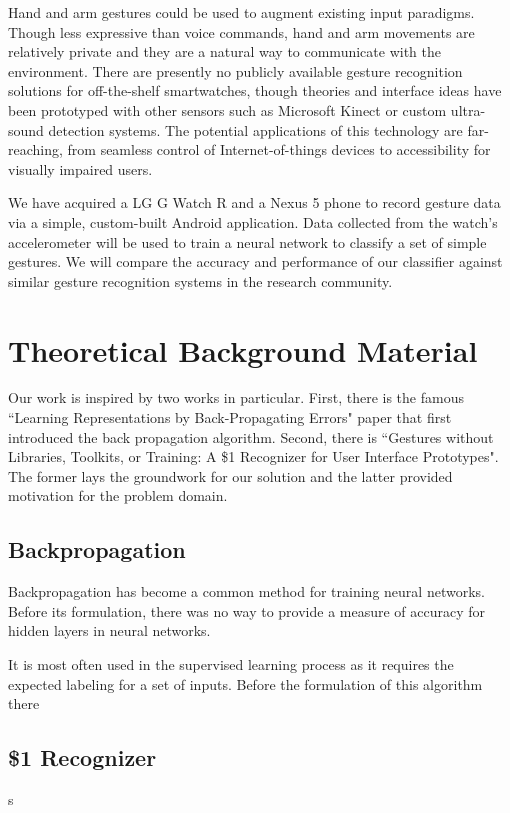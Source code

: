 \documentclass{report}
\begin{document}
Hand and arm gestures could be used to augment existing input paradigms. Though less expressive than voice commands, hand and arm movements are relatively private and they are a natural way to communicate with the environment. There are presently no publicly available gesture recognition solutions for off-the-shelf smartwatches, though theories and interface ideas have been prototyped with other sensors such as Microsoft Kinect or custom ultra-sound detection systems. The potential applications of this technology are far-reaching, from seamless control of Internet-of-things devices to accessibility for visually impaired users.

We have acquired a LG G Watch R and a Nexus 5 phone to record gesture data via a simple, custom-built Android application. Data collected from the watch's accelerometer will be used to train a neural network to classify a set of simple gestures. We will compare the accuracy and performance of our classifier against similar gesture recognition systems in the research community.

\chapter{Theoretical Background Material}
Our work is inspired by two works in particular. First, there is the famous ``Learning Representations by Back-Propagating Errors" paper that first introduced the back propagation algorithm. Second, there is ``Gestures without Libraries, Toolkits, or Training: A \$1 Recognizer for User Interface Prototypes". The former lays the groundwork for our solution and the latter provided motivation for the problem domain.

\section{Backpropagation}

Backpropagation has become a common method for training neural networks. Before its formulation,  there was no way to provide a measure of accuracy for hidden layers in neural networks.

It is most often used in the supervised learning process as it requires the expected labeling for a set of inputs.  Before the formulation of this algorithm there

\section{\$1 Recognizer}s
\end{document}

